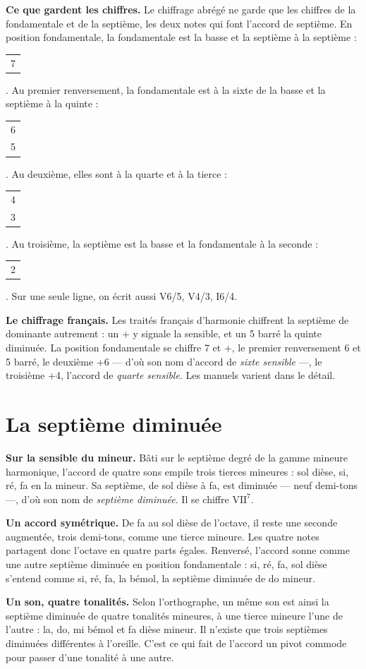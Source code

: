 \documentclass[a4paper,11pt]{article}
\makeatletter
\newcommand{\ch}[3]{\ensuremath{\mathrm{#1}^{#2}_{#3}}}
\newcommand{\fig}[1]{{\footnotesize\renewcommand{\arraystretch}{0.75}%
  \begin{tabular}[c]{@{}c@{}}#1\end{tabular}}}
\makeatother
\begin{document}
\begin{remarque}
\textbf{Ce que gardent les chiffres.} Le chiffrage abrégé ne garde que les
chiffres de la fondamentale et de la septième, les deux notes qui font
l'accord de septième. En position fondamentale, la fondamentale est la basse
et la septième à la septième : \fig{7}. Au premier renversement, la
fondamentale est à la sixte de la basse et la septième à la quinte :
\fig{6\\5}. Au deuxième, elles sont à la quarte et à la tierce :
\fig{4\\3}. Au troisième, la septième est la basse et la fondamentale à la
seconde : \fig{2}. Sur une seule ligne, on écrit aussi V6/5, V4/3, I6/4.
\end{remarque}

\begin{remarque}
\textbf{Le chiffrage français.} Les traités français d'harmonie chiffrent la
septième de dominante autrement : un + y signale la sensible, et un 5 barré la
quinte diminuée. La position fondamentale se chiffre 7 et +, le premier
renversement 6 et 5 barré, le deuxième +6 --- d'où son nom d'accord de
\emph{sixte sensible} ---, le troisième +4, l'accord de \emph{quarte
sensible}. Les manuels varient dans le détail.
\end{remarque}

\section{La septième diminuée}
\label{sec:diminuee}

\textbf{Sur la sensible du mineur.} Bâti sur le septième degré de la gamme
mineure harmonique, l'accord de quatre sons empile trois tierces mineures :
sol dièse, si, ré, fa en la mineur. Sa septième, de sol dièse à fa, est
diminuée --- neuf demi-tons ---, d'où son nom de \emph{septième diminuée}. Il se
chiffre \ch{VII}{7}{}.

\textbf{Un accord symétrique.} De fa au sol dièse de l'octave, il reste une
seconde augmentée, trois demi-tons, comme une tierce mineure. Les quatre notes
partagent donc l'octave en quatre parts égales. Renversé, l'accord sonne comme
une autre septième diminuée en position fondamentale : si, ré, fa, sol dièse
s'entend comme si, ré, fa, la bémol, la septième diminuée de do mineur.

\textbf{Un son, quatre tonalités.} Selon l'orthographe, un même son est ainsi
la septième diminuée de quatre tonalités mineures, à une tierce mineure l'une
de l'autre : la, do, mi bémol et fa dièse mineur. Il n'existe que trois
septièmes diminuées différentes à l'oreille. C'est ce qui fait de l'accord un
pivot commode pour passer d'une tonalité à une autre.
\end{document}
